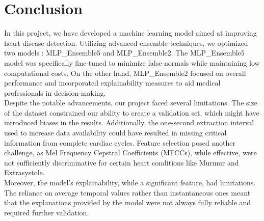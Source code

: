\section{Conclusion}
In this project, we have developed a machine learning model aimed at improving heart disease detection.
Utilizing advanced ensemble techniques, we optimized two models : MLP\_Ensemble5 and MLP\_Ensemble2.
The MLP\_Ensemble5 model was specifically fine-tuned to minimize false normals while maintaining low computational costs.
On the other hand, MLP\_Ensemble2 focused on overall performance and incorporated explainability measures to aid medical professionals in decision-making.\\
Despite the notable advancements, our project faced several limitations. The size of the dataset constrained our ability to create a validation set,
which might have introduced biases in the results. Additionally, the one-second extraction interval used
to increase data availability could have resulted in missing critical information from complete cardiac cycles.
Feature selection posed another challenge, as Mel Frequency Cepstral Coefficients (MFCCs), while effective,
were not sufficiently discriminative for certain heart conditions like Murmur and Extrasystole.\\
Moreover, the model's explainability, while a significant feature, had limitations.
The reliance on average temporal values rather than instantaneous ones meant that the explanations provided by the model were not always fully
reliable and required further validation.

\vfill
